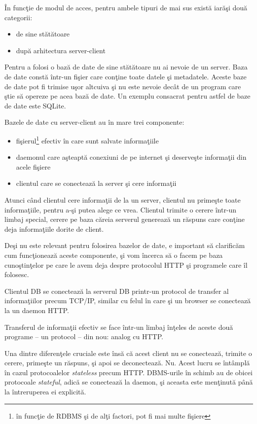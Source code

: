 În funcţie de modul de acces, pentru ambele tipuri de mai sus există
iarăşi două categorii:
\begin{itemize}
\item de sine stătătoare
\item după arhitectura server-client
\end{itemize}

Pentru a folosi o bază de date de sine stătătoare nu ai nevoie de un
server. Baza de date constă într-un fişier care conţine toate datele
şi metadatele. Aceste baze de date pot fi trimise uşor altcuiva
şi nu este nevoie decât de un program care ştie să opereze pe acea
bază de date. Un exemplu consacrat pentru astfel de baze de date
este SQLite.

Bazele de date cu server-client au în mare trei componente:
\begin{itemize}
\item fişierul\footnote{în funcţie de RDBMS şi de alţi
factori, pot fi mai multe fişiere} efectiv în care sunt salvate
informaţiile
\item daemonul care aşteaptă conexiuni de pe internet şi
deserveşte informaţii din acele fişiere
\item clientul care se conectează la server şi cere informaţii
\end{itemize}

Atunci când clientul cere informaţii de la un server, clientul
nu primeşte toate informaţiile, pentru a-şi putea alege ce vrea.
Clientul trimite o cerere într-un limbaj special, cerere pe baza
căreia serverul generează un răspuns care conţine deja informaţiile
dorite de client.

Deşi nu este relevant pentru folosirea bazelor de date, e important
să clarificăm cum funcţionează aceste componente, şi vom încerca
să o facem pe baza cunoştinţelor pe care le avem deja despre
protocolul HTTP şi programele care îl folosesc.

Clientul DB se conectează la serverul DB printr-un protocol
de transfer al informaţiilor precum TCP/IP, similar cu
felul în care şi un browser se conectează la un daemon HTTP.

Transferul de informaţii efectiv se face într-un limbaj înţeles
de aceste două programe -- un protocol -- din nou: analog cu HTTP.

Una dintre diferenţele cruciale este însă că acest client nu se
conectează, trimite o cerere, primeşte un răspuns, şi apoi se
deconectează. Nu. Acest lucru se întâmplă în cazul protocoalelor
\textit{stateless} precum HTTP. DBMS-urile în schimb au de obicei
protocoale \textsl{stateful}, adică se conectează la daemon, şi
aceasta este menţinută până la întreruperea ei explicită.

